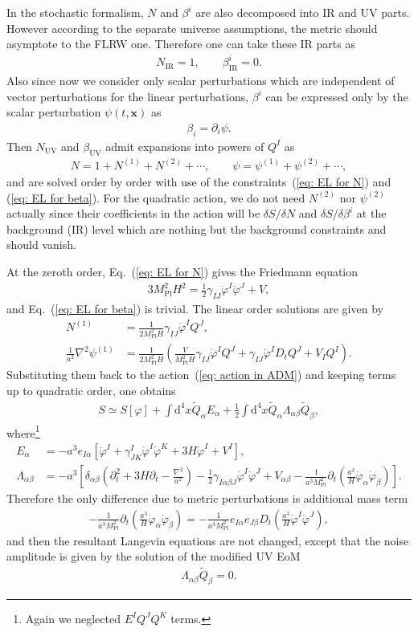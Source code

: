 \documentclass[aps, prd
, preprint
, nofootinbib 
]{revtex4-1}
\newcommand{\dd}{\mathrm{d}}
\newcommand{\Mpl}{M_\text{Pl}}
\newcommand{\bae}[1]{\begin{align} #1 \end{align}}
\begin{document}
In the stochastic formalism, $N$ and $\beta^i$ are also decomposed into IR and UV parts. However according to the separate universe 
assumptions, the metric should asymptote to the FLRW one. Therefore one can take these IR parts as
\bae{
	N_\text{IR}=1, \quad\quad \beta^i_\text{IR}=0.
}
Also since now we consider only scalar perturbations which are independent of vector perturbations for the linear perturbations,
$\beta^i$ can be expressed only by the scalar perturbation $\psi(t,\mathbf{x})$ as
\bae{
	\beta_i=\partial_i\psi.
}
Then $N_\text{UV}$ and $\beta_\text{UV}$ admit expansions into powers of $Q^I$ as
\bae{
	N=1+N^{(1)}+N^{(2)}+\cdots, \quad\quad \psi=\psi^{(1)}+\psi^{(2)}+\cdots,
}
and are solved order by order with use of the constraints~(\ref{eq: EL for N}) and (\ref{eq: EL for beta}).
For the quadratic action, we do not need $N^{(2)}$ nor $\psi^{(2)}$ actually since their coefficients in the action will be
$\delta S/\delta N$ and $\delta S/\delta \beta^i$ at the background (IR) level which are nothing but the background constraints and
should vanish.

At the zeroth order, Eq.~(\ref{eq: EL for N}) gives the Friedmann equation
\bae{
	3\Mpl^2H^2=\frac{1}{2}\gamma_{IJ}\dot{\varphi}^I\dot{\varphi}^J+V,
}
and Eq.~(\ref{eq: EL for beta}) is trivial. The linear order solutions are given by
\bae{
	N^{(1)}&=\frac{1}{2\Mpl^2H}\gamma_{IJ}\dot{\varphi}^IQ^J, \\
	\frac{1}{a^2}\nabla^2\psi^{(1)}&=\frac{1}{2\Mpl^2H}\left(\frac{V}{\Mpl^2H}\gamma_{IJ}\dot{\varphi}^IQ^J+\gamma_{IJ}\dot{\varphi}^ID_tQ^J
	+V_IQ^I\right).
}
Substituting them back to the action~(\ref{eq: action in ADM}) and keeping terms up to quadratic order, one obtains
\bae{
	S\simeq S[\varphi]+\int\dd^4x\tilde{Q}_\alpha E_\alpha+\frac{1}{2}\int\dd^4x\tilde{Q}_\alpha\Lambda_{\alpha\beta}\tilde{Q}_\beta,
}
where\footnote{Again we neglected $E^IQ^JQ^K$ terms.}
\bae{
	E_\alpha&=-a^3e_{I\alpha}\left[\ddot{\varphi}^I+\gamma^I_{JK}\dot{\varphi}^I\dot{\varphi}^K+3H\dot{\varphi}^I+V^I\right], \\
	\Lambda_{\alpha\beta}&=-a^3\left[\delta_{\alpha\beta}\left(\partial_t^2+3H\partial_t-\frac{\nabla^2}{a^2}\right)
	-\frac{1}{2}\gamma_{I\alpha\beta J}\dot{\varphi}^I\dot{\varphi}^J+V_{\alpha\beta}
	-\frac{1}{a^3\Mpl^2}\partial_t\left(\frac{a^3}{H}\dot{\varphi}_\alpha\dot{\varphi}_\beta\right)\right].
}
Therefore the only difference due to metric perturbations is additional mass term
\bae{
	-\frac{1}{a^3\Mpl^2}\partial_t\left(\frac{a^3}{H}\dot{\varphi}_\alpha\dot{\varphi}_\beta\right)
	=-\frac{1}{a^3\Mpl^2}e_{I\alpha}e_{J\beta}D_t\left(\frac{a^3}{H}\dot{\varphi}^I\dot{\varphi}^J\right),
}
and then the resultant Langevin equations are not changed, except that the noise amplitude is given by
the solution of the modified UV EoM
\bae{
	\Lambda_{\alpha\beta}\tilde{Q}_\beta=0.
}
\end{document}
